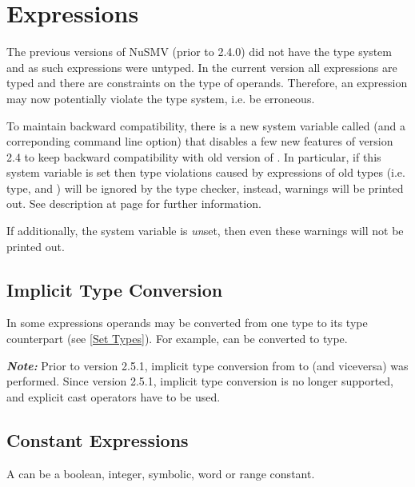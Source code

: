 
\section{Expressions}
\label{Expressions}
%

The previous versions of NuSMV (prior to 2.4.0) did not have the type
system and as such expressions were untyped.
%
In the current version all expressions are typed and there are
constraints on the type of operands.
%
Therefore, an expression may now potentially violate the type system,
i.e. be erroneous.

To maintain backward compatibility, there is a new system variable
called  (and a correponding 
command line option) that disables a few new features of version 2.4
to keep backward compatibility with old version of
\nusmv. In particular, if this system variable is set then type violations
caused by expressions of old types (i.e. \Enum type, \Boolean and
\Integer) will be ignored by the type checker, instead, warnings will
be printed out. See description at page
\pageref{ref::backwardcompatibility} for further information.

If additionally, the system variable
 is
\emph{un}set, then even these warnings will not be printed out.

\subsection{Implicit Type Conversion}
\label{Implicit Type Conversion}

In some expressions operands may be converted from one type to
its \Set type counterpart (see \ref{Set Types}). For example, \Integer
can be converted to \IntSet type.

\textbf{\textit{Note:}} Prior to version 2.5.1, implicit type
conversion from \Integer to \Boolean (and viceversa) was
performed. Since version 2.5.1, implicit \Integer <-> \Boolean type
conversion is no longer supported, and explicit cast operators have
to be used.

\subsection{Constant Expressions}
\label{Constant Expressions}
%
%
A  can be a boolean,
integer, symbolic, word or range constant.

